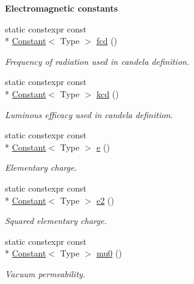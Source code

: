 \begin{Indent}{\bf Electromagnetic constants}\par
\begin{DoxyCompactItemize}
\item 
static constexpr const \\*
\hyperlink{exceptionmagrathea_1_1Constant}{Constant}$<$ Type $>$ \hyperlink{exceptionmagrathea_1_1Constants_a7a960dec9aadb119e3db07f8207bc03a}{fcd} ()
\begin{DoxyCompactList}\small\item\em Frequency of radiation used in candela definition. \end{DoxyCompactList}\item 
static constexpr const \\*
\hyperlink{exceptionmagrathea_1_1Constant}{Constant}$<$ Type $>$ \hyperlink{exceptionmagrathea_1_1Constants_ab91bde065e833e7c11673b61510e37ca}{kcd} ()
\begin{DoxyCompactList}\small\item\em Luminous efficacy used in candela definition. \end{DoxyCompactList}\item 
static constexpr const \\*
\hyperlink{exceptionmagrathea_1_1Constant}{Constant}$<$ Type $>$ \hyperlink{exceptionmagrathea_1_1Constants_ac2e9f2f28e589e0649dbbfaa196a7764}{e} ()
\begin{DoxyCompactList}\small\item\em Elementary charge. \end{DoxyCompactList}\item 
static constexpr const \\*
\hyperlink{exceptionmagrathea_1_1Constant}{Constant}$<$ Type $>$ \hyperlink{exceptionmagrathea_1_1Constants_addf13d2a6c71eafe82debce3624f3170}{e2} ()
\begin{DoxyCompactList}\small\item\em Squared elementary charge. \end{DoxyCompactList}\item 
static constexpr const \\*
\hyperlink{exceptionmagrathea_1_1Constant}{Constant}$<$ Type $>$ \hyperlink{exceptionmagrathea_1_1Constants_a54cca99617e5791fd43bee052e0fa998}{mu0} ()
\begin{DoxyCompactList}\small\item\em Vacuum permeability. \end{DoxyCompactList}\item 

\end{DoxyCompactItemize}
\end{Indent}
